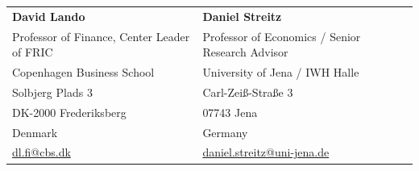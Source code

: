 \documentclass[11pt,a4paper]{article}
\begin{document}
\noindent
\begin{tabularx}{\textwidth}{@{}X X@{}}
\textbf{David Lando} & \textbf{Daniel Streitz} \\
Professor of Finance, Center Leader of FRIC & Professor of Economics / Senior Research Advisor \\
Copenhagen Business School & University of Jena / IWH Halle \\
Solbjerg Plads 3 & Carl-Zeiß-Straße 3 \\
DK-2000 Frederiksberg & 07743 Jena \\
Denmark & Germany \\
\href{mailto:dl.fi@cbs.dk}{dl.fi@cbs.dk} & \href{mailto:daniel.streitz@uni-jena.de}{daniel.streitz@uni-jena.de} \\
\end{tabularx}
\end{document}
